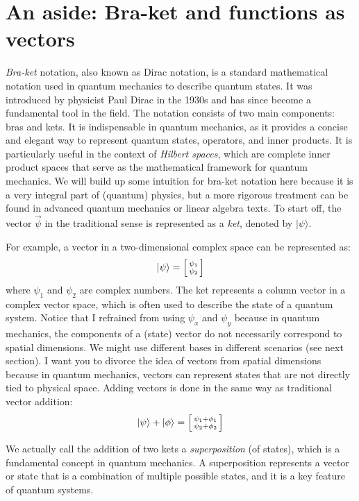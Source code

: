 \section{An aside: Bra-ket and functions as vectors}


\textit{Bra-ket} notation, also known as Dirac notation, is a standard mathematical notation used in quantum mechanics to describe quantum states. It was introduced by physicist Paul Dirac in the 1930s and has since become a fundamental tool in the field. The notation consists of two main components: bras and kets. It is indispensable in quantum mechanics, as it provides a concise and elegant way to represent quantum states, operators, and inner products. It is particularly useful in the context of \textit{Hilbert spaces}, which are complete inner product spaces that serve as the mathematical framework for quantum mechanics. We will build up some intuition for bra-ket notation here because it is a very integral part of (quantum) physics, but a more rigorous treatment can be found in advanced quantum mechanics or linear algebra texts. To start off, the vector \(\vec{\psi}\) in the traditional sense is represented as a \textit{ket}, denoted by \(|\psi\rangle\). 
\begin{example}
  For example, a vector in a two-dimensional complex space can be represented as: 
  \begin{equation*}
    |\psi\rangle = \begin{bsmallmatrix}
      \psi_1 \\
      \psi_2
    \end{bsmallmatrix}
  \end{equation*}
  where \(\psi_1\) and \(\psi_2\) are complex numbers. The ket represents a column vector in a complex vector space, which is often used to describe the state of a quantum system. Notice that I refrained from using \(\psi_x\) and \(\psi_y\) because in quantum mechanics, the components of a (state) vector do not necessarily correspond to spatial dimensions. We might use different bases in different scenarios (see next section). I want you to divorce the idea of vectors from spatial dimensions because in quantum mechanics, vectors can represent states that are not directly tied to physical space. Adding vectors is done in the same way as traditional vector addition:
  \begin{equation*}
    |\psi\rangle + |\phi\rangle = \begin{bsmallmatrix}
      \psi_1 + \phi_1 \\
      \psi_2 + \phi_2
    \end{bsmallmatrix}
  \end{equation*}

  We actually call the addition of two kets a \textit{superposition} (of states), which is a fundamental concept in quantum mechanics. A superposition represents a vector or state that is a combination of multiple possible states, and it is a key feature of quantum systems.
\end{example}


